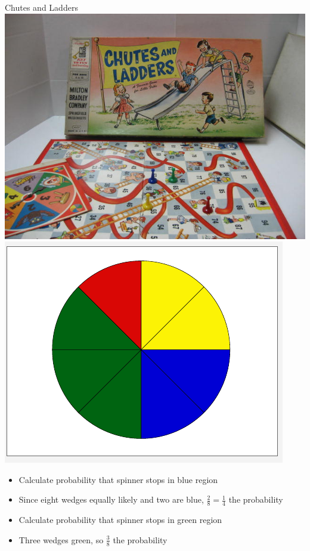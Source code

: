 \documentclass[handout]{beamer}
\theoremstyle{definition}
\begin{document}
\begin{frame}{Chutes and Ladders}
\includegraphics[scale=.22]{ChutesAndLadders}
\includegraphics[scale=.30]{Spinner}
\begin{itemize}
\item Calculate probability that spinner stops in blue region
\item Since eight wedges equally likely and two are blue,
$\frac{2}{8}=\frac{1}{4}$ the probability 
\item Calculate probability that spinner stops in green region
\item Three wedges green, so $\frac{3}{8}$ the probability
\end{itemize}
\end{frame}
\end{document}
